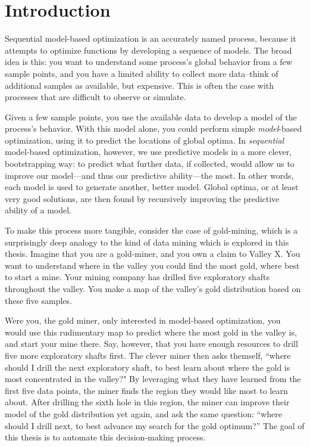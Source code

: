 \chapter{Introduction}

Sequential model-based optimization is an accurately named process, because it attempts to optimize functions by developing a sequence of models. The broad idea is this: you want to understand some process's global behavior from a few sample points, and you have a limited ability to collect more data--think of additional samples as available, but expensive. This is often the case with processes that are difficult to observe or simulate.

Given a few sample points, you use the available data to develop a model of the process's behavior.  With this model alone, you could perform simple \emph{model}-based optimization, using it to predict the locations of global optima. In \emph{sequential} model-based optimization, however, we use predictive models in a more clever, bootstrapping way: to predict what further data, if collected, would allow us to improve our model---and thus our predictive ability---the most. In other words, each model is used to generate another, better model. Global optima, or at least very good solutions, are then found by recursively improving the predictive ability of a model.

To make this process more tangible, consider the case of gold-mining, which is a surprisingly deep analogy to the kind of data mining which is explored in this thesis. Imagine that you are a gold-miner, and you own a claim to Valley X. You want to understand where in the valley you could find the most gold, where best to start a mine. Your mining company has drilled five exploratory shafts throughout the valley. You make a map of the valley's gold distribution based on these five samples.

Were you, the gold miner, only interested in model-based optimization, you would use this rudimentary map to predict where the most gold in the valley is, and start your mine there. Say, however, that you have enough resources to drill five more exploratory shafts first. The clever miner then asks themself, ``where should I drill the next exploratory shaft, to best learn about where the gold is most concentrated in the valley?" By leveraging what they have learned from the first five data points, the miner finds the region they would like most to learn about. After drilling the sixth hole in this region, the miner can improve their model of the gold distribution yet again, and ask the same question: ``where should I drill next, to best advance my search for the gold optimum?'' The goal of this thesis is to automate this decision-making process.

